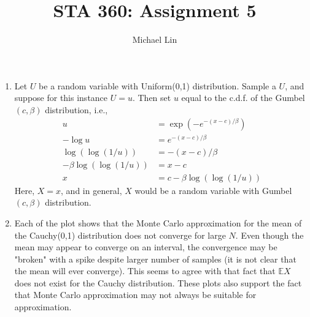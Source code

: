 \documentclass{article}
\title{STA 360: Assignment 5}
\author{Michael Lin}
\begin{document}
\maketitle

\begin{enumerate}
\item Let $U$ be a random variable with Uniform(0,1) distribution. Sample a $U$, and suppose for this instance $U=u$. Then set $u$ equal to the c.d.f. of the Gumbel$(c,\beta)$ distribution, i.e.,
\begin{align*}
u &= \exp(-e^{-(x-c)/\beta}) \\
-\log u &= e^{-(x-c)/\beta} \\
\log(\log(1/u)) &= -(x-c)/\beta \\
-\beta\log(\log(1/u)) &=x-c \\
x &= c-\beta \log(\log(1/u))
\end{align*}
Here, $X=x$, and in general, $X$ would be a random variable with Gumbel$(c,\beta)$ distribution.

\item Each of the plot shows that the Monte Carlo approximation for the mean of the Cauchy(0,1) distribution does not converge for large $N$. Even though the mean may appear to converge on an interval, the convergence may be "broken" with a spike despite larger number of samples (it is not clear that the mean will ever converge). This seems to agree with that fact that $\mathds{E}X$ does not exist for the Cauchy distribution. These plots also support the fact that Monte Carlo approximation may not always be suitable for approximation.


\end{enumerate}
\end{document}
